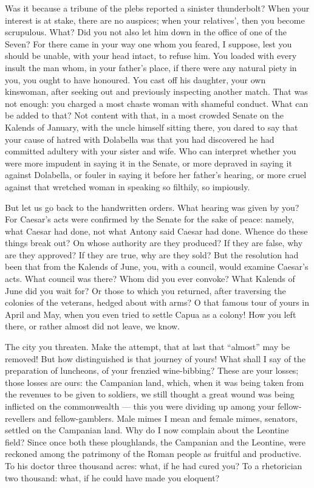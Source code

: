  Was it because a tribune of the plebs reported a sinister thunderbolt? When your interest is at stake, there are no auspices; when your relatives', then you become scrupulous. What? Did you not also let him down in the office of one of the Seven? For there came in your way one whom you feared, I suppose, lest you should be unable, with your head intact, to refuse him. You loaded with every insult the man whom, in your father's place, if there were any natural piety in you, you ought to have honoured. You cast off his daughter, your own kinswoman, after seeking out and previously inspecting another match. That was not enough: you charged a most chaste woman with shameful conduct. What can be added to that? Not content with that, in a most crowded Senate on the Kalends of January, with the uncle himself sitting there, you dared to say that your cause of hatred with Dolabella was that you had discovered he had committed adultery with your sister and wife. Who can interpret whether you were more impudent in saying it in the Senate, or more depraved in saying it against Dolabella, or fouler in saying it before her father's hearing, or more cruel against that wretched woman in speaking so filthily, so impiously.

 But let us go back to the handwritten orders. What hearing was given by you? For Caesar's acts were confirmed by the Senate for the sake of peace: namely, what Caesar had done, not what Antony said Caesar had done. Whence do these things break out? On whose authority are they produced? If they are false, why are they approved? If they are true, why are they sold? But the resolution had been that from the Kalends of June, you, with a council, would examine Caesar's acts. What council was there? Whom did you ever convoke? What Kalends of June did you wait for? Or those to which you returned, after traversing the colonies of the veterans, hedged about with arms? O that famous tour of yours in April and May, when you even tried to settle Capua as a colony! How you left there, or rather almost did not leave, we know.

 The city you threaten. Make the attempt, that at last that ``almost'' may be removed! But how distinguished is that journey of yours! What shall I say of the preparation of luncheons, of your frenzied wine-bibbing? These are your losses; those losses are ours: the Campanian land, which, when it was being taken from the revenues to be given to soldiers, we still thought a great wound was being inflicted on the commonwealth --- this you were dividing up among your fellow-revellers and fellow-gamblers. Male mimes I mean and female mimes, senators, settled on the Campanian land. Why do I now complain about the Leontine field? Since once both these ploughlands, the Campanian and the Leontine, were reckoned among the patrimony of the Roman people as fruitful and productive. To his doctor three thousand acres: what, if he had cured you? To a rhetorician two thousand: what, if he could have made you eloquent?


